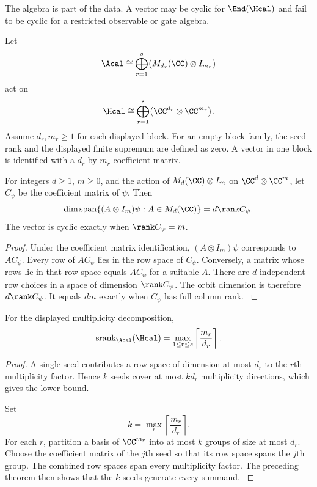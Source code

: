 The algebra is part of the data. A vector may be cyclic for \(\End(\Hcal)\) and fail to be cyclic for a restricted observable or gate algebra.

Let
\[
\Acal
\cong
\bigoplus_{r=1}^{s}
\bigl(M_{d_r}(\CC)\otimes I_{m_r}\bigr)
\]
act on
\[
\Hcal
\cong
\bigoplus_{r=1}^{s}
\bigl(\CC^{d_r}\otimes\CC^{m_r}\bigr).
\]
Assume \(d_r,m_r\ge1\) for each displayed block. For an empty block family, the seed rank and the displayed finite supremum are defined as zero. A vector in one block is identified with a \(d_r\) by \(m_r\) coefficient matrix.

\begin{theorem}\label{strong:theorem:001}\label{strong:thm:orbit_dimension}
For integers \(d\ge1\), \(m\ge0\), and the action of \(M_d(\CC)\otimes I_m\) on \(\CC^d\otimes\CC^m\), let \(C_\psi\) be the coefficient matrix of \(\psi\). Then
\[
\dim\operatorname{span}\{(A\otimes I_m)\psi:A\in M_d(\CC)\}
=
 d\rank C_\psi.
\]
The vector is cyclic exactly when \(\rank C_\psi=m\).
\end{theorem}

\begin{proof}\label{strong:proof:001}
Under the coefficient matrix identification, \((A\otimes I_m)\psi\) corresponds to \(AC_\psi\). Every row of \(AC_\psi\) lies in the row space of \(C_\psi\). Conversely, a matrix whose rows lie in that row space equals \(AC_\psi\) for a suitable \(A\). There are \(d\) independent row choices in a space of dimension \(\rank C_\psi\). The orbit dimension is therefore \(d\rank C_\psi\). It equals \(dm\) exactly when \(C_\psi\) has full column rank.
\label{strong:proof:001:end}\end{proof}

\begin{theorem}\label{strong:theorem:002}\label{strong:thm:quantum_seed_rank}
For the displayed multiplicity decomposition,
\[
\operatorname{srank}_{\Acal}(\Hcal)
=
\max_{1\le r\le s}
\left\lceil\frac{m_r}{d_r}\right\rceil.
\]
\end{theorem}

\begin{proof}\label{strong:proof:002}
A single seed contributes a row space of dimension at most \(d_r\) to the \(r\)th multiplicity factor. Hence \(k\) seeds cover at most \(kd_r\) multiplicity directions, which gives the lower bound.

Set
\[
k=\max_r\left\lceil\frac{m_r}{d_r}\right\rceil.
\]
For each \(r\), partition a basis of \(\CC^{m_r}\) into at most \(k\) groups of size at most \(d_r\). Choose the coefficient matrix of the \(j\)th seed so that its row space spans the \(j\)th group. The combined row spaces span every multiplicity factor. The preceding theorem then shows that the \(k\) seeds generate every summand.
\label{strong:proof:002:end}\end{proof}

